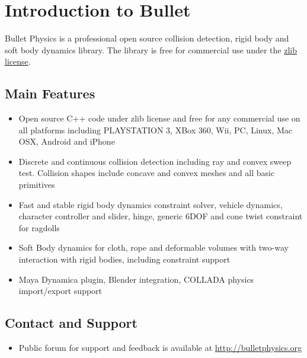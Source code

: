 

\chapter{Introduction to Bullet}
Bullet Physics is a professional open source collision detection, rigid body and soft body dynamics library. The library is free for commercial use under the  \href{http://opensource.org/licenses/zlib-license.php}{zlib license}.

\section{Main Features}

\begin{itemize}
	\item Open source C++ code under zlib license and free for any commercial use on all platforms including PLAYSTATION 3, XBox 360, Wii, PC, Linux, Mac OSX, Android and iPhone
	\item Discrete and continuous collision detection including ray and convex sweep test. Collision shapes include concave and convex meshes and all basic primitives
	\item Fast and stable rigid body dynamics constraint solver, vehicle dynamics, character controller and slider, hinge, generic 6DOF and cone twist constraint for ragdolls
	\item Soft Body dynamics for cloth, rope and deformable volumes with two-way interaction with rigid bodies, including constraint support
	\item Maya Dynamica plugin, Blender integration, COLLADA physics import/export support
\end{itemize}

\section{Contact and Support}
\begin{itemize}
	\item Public forum for support and feedback is available at \url{http://bulletphysics.org}
\end{itemize}

